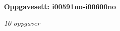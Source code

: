 \centerline{\bf Oppgavesett: i00591no-i00600no}
\vskip 10pt
\centerline{\it 10 oppgaver}\vskip 10pt
\vskip 10pt
